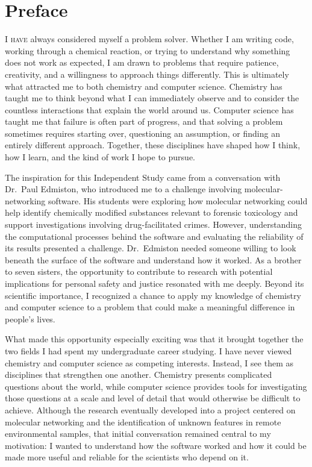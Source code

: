 \chapter*{Preface}\label{pref}

\lettrine[lines=2, lhang=0.33, loversize=0.1]{I}{ have}
always considered myself a problem solver. Whether I am writing code,
working through a chemical reaction, or trying to understand why
something does not work as expected, I am drawn to problems that require
patience, creativity, and a willingness to approach things differently.
This is ultimately what attracted me to both chemistry and computer
science. Chemistry has taught me to think beyond what I can immediately
observe and to consider the countless interactions that explain the
world around us. Computer science has taught me that failure is often
part of progress, and that solving a problem sometimes requires starting
over, questioning an assumption, or finding an entirely different
approach. Together, these disciplines have shaped how I think, how I
learn, and the kind of work I hope to pursue.

The inspiration for this Independent Study came from a conversation
with Dr.~Paul Edmiston, who introduced me to a challenge involving
molecular-networking software. His students were exploring how
molecular networking could help identify chemically modified substances
relevant to forensic toxicology and support investigations involving
drug-facilitated crimes. However, understanding the computational
processes behind the software and evaluating the reliability of its
results presented a challenge. Dr.~Edmiston needed someone willing to
look beneath the surface of the software and understand how it worked.
As a brother to seven sisters, the opportunity to contribute to research
with potential implications for personal safety and justice resonated
with me deeply. Beyond its scientific importance, I recognized a chance
to apply my knowledge of chemistry and computer science to a problem
that could make a meaningful difference in people's lives.

What made this opportunity especially exciting was that it brought
together the two fields I had spent my undergraduate career studying.
I have never viewed chemistry and computer science as competing
interests. Instead, I see them as disciplines that strengthen one
another. Chemistry presents complicated questions about the world,
while computer science provides tools for investigating those questions
at a scale and level of detail that would otherwise be difficult to
achieve. Although the research eventually developed into a project
centered on molecular networking and the identification of unknown
features in remote environmental samples, that initial conversation
remained central to my motivation: I wanted to understand how the
software worked and how it could be made more useful and reliable for
the scientists who depend on it.

